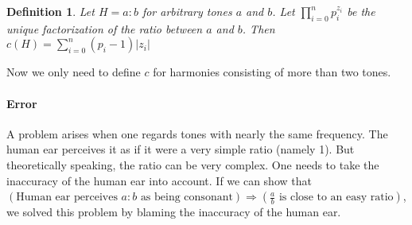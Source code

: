 \documentclass[a4paper]{report}
\newtheorem{dfn}[thm]{Definition}
\newcommand{\cln}{\mathbin{:}}
\begin{document}
\begin{dfn}
	Let $H = a \cln b$ for arbitrary tones $a$ and $b$.
	Let $\prod_{i=0}^{n} p_i^{z_i}$ be the unique factorization of the ratio between $a$ and $b$.
	Then $c(H) = \sum_{i=0}^{n} {(p_i-1)|z_i|}$
\end{dfn}

Now we only need to define $c$ for harmonies consisting of more than two tones.


\paragraph{Error}
A problem arises when one regards tones with nearly the same frequency.
The human ear perceives it as if it were a very simple ratio (namely 1).
But theoretically speaking, the ratio can be very complex.
One needs to take the inaccuracy of the human ear into account.
If we can show that $(\text{Human ear perceives } a \cln b \text{ as being consonant}) \Rightarrow (\frac{a}{b} \text{ is close to an easy ratio})$, we solved this problem by blaming the inaccuracy of the human ear.
\end{document}
